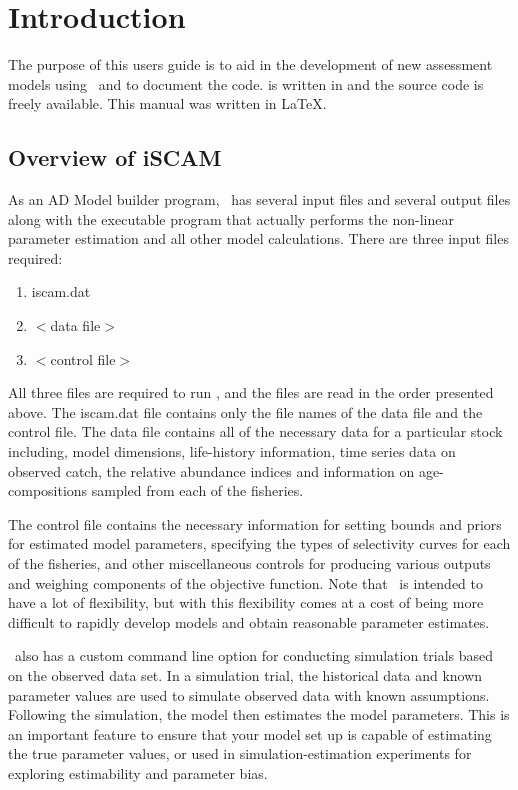 
\section{Introduction} %
\label{sec:introduction}
\begin{multicols}{2}
	The purpose of this users guide is to aid in the development of new assessment models using \iscam\ and to document the code. \iscam{} is written in \admb{} and the source code is freely available.  This manual was written in \LaTeX{}.

\subsection{Overview of iSCAM} %
\label{sub:overview}
As an AD Model builder program, \iscam\ has several input files and several output files along with the executable program that actually performs the non-linear parameter estimation and all other model calculations.  There are three input files required:
\begin{enumerate}
	\item iscam.dat
	\item $<$data file$>$
	\item $<$control file$>$
\end{enumerate}
 All three files are required to run \iscam, and the files are read in the order presented above.  The iscam.dat file contains only the file names of the data file and the control file.  The data file contains all of the necessary data for a particular stock including, model dimensions, life-history information, time series data on observed catch, the relative abundance indices and information on age-compositions sampled from each of the fisheries.
 
 The control file contains the necessary information for setting bounds and priors for estimated model parameters, specifying the types of selectivity curves for each of the fisheries, and other miscellaneous controls for producing various outputs and weighing components of the objective function.  Note that \iscam\ is intended to have a lot of flexibility, but with this flexibility comes at a cost of being more difficult to rapidly develop models and obtain reasonable parameter estimates.
 
 \iscam\ also has a custom command line option for conducting simulation trials based on the observed data set. In a simulation trial, the historical data and known parameter values are used to simulate observed data with known assumptions. Following the simulation, the model then estimates the model parameters.   This is an important feature to ensure that your model set up is capable of estimating the true parameter values, or used in simulation-estimation experiments for exploring estimability and parameter bias.
 

\end{multicols}

